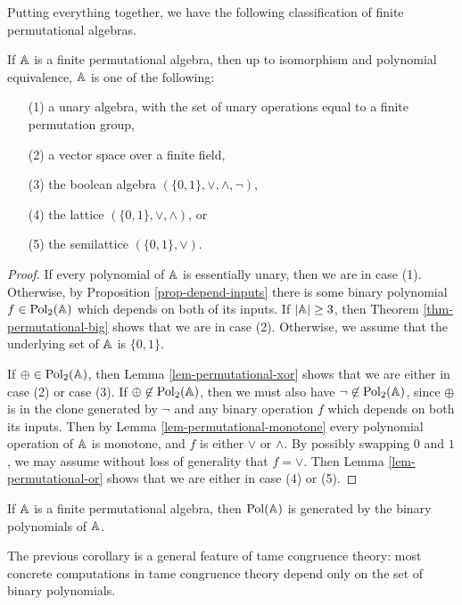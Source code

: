 \begin{appendices}
Putting everything together, we have the following classification of finite permutational algebras.

\begin{thm} If $\mathbb{A}$ is a finite permutational algebra, then up to isomorphism and polynomial equivalence, $\mathbb{A}$ is one of the following:
\begin{itemize}
\item[(1)] a unary algebra, with the set of unary operations equal to a finite permutation group,

\item[(2)] a vector space over a finite field,

\item[(3)] the boolean algebra $(\{0,1\},\vee,\wedge,\neg)$,

\item[(4)] the lattice $(\{0,1\},\vee,\wedge)$, or

\item[(5)] the semilattice $(\{0,1\},\vee)$.
\end{itemize}
\end{thm}
\begin{proof} If every polynomial of $\mathbb{A}$ is essentially unary, then we are in case (1). Otherwise, by Proposition \ref{prop-depend-inputs} there is some binary polynomial $f \in \operatorname{Pol}_2(\mathbb{A})$ which depends on both of its inputs. If $|\mathbb{A}| \ge 3$, then Theorem \ref{thm-permutational-big} shows that we are in case (2). Otherwise, we assume that the underlying set of $\mathbb{A}$ is $\{0,1\}$.

If $\oplus \in \operatorname{Pol}_2(\mathbb{A})$, then Lemma \ref{lem-permutational-xor} shows that we are either in case (2) or case (3). If $\oplus \not\in \operatorname{Pol}_2(\mathbb{A})$, then we must also have $\neg \not\in \operatorname{Pol}_2(\mathbb{A})$, since $\oplus$ is in the clone generated by $\neg$ and any binary operation $f$ which depends on both its inputs. Then by Lemma \ref{lem-permutational-monotone} every polynomial operation of $\mathbb{A}$ is monotone, and $f$ is either $\vee$ or $\wedge$. By possibly swapping $0$ and $1$, we may assume without loss of generality that $f = \vee$. Then Lemma \ref{lem-permutational-or} shows that we are either in case (4) or (5).
\end{proof}

\begin{cor} If $\mathbb{A}$ is a finite permutational algebra, then $\operatorname{Pol}(\mathbb{A})$ is generated by the binary polynomials of $\mathbb{A}$.
\end{cor}

The previous corollary is a general feature of tame congruence theory: most concrete computations in tame congruence theory depend only on the set of binary polynomials.


\end{appendices}
